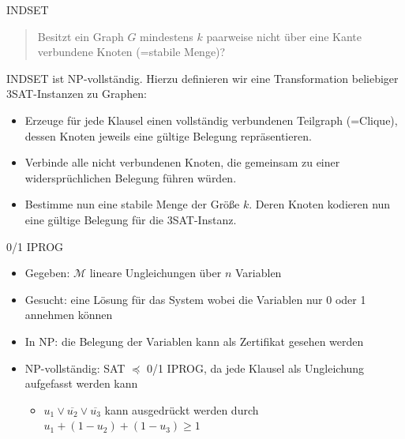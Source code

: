 \documentclass[ignorenonframetext,]{beamer}
\begin{document}
\begin{frame}{INDSET}

\begin{quote}
Besitzt ein Graph $G$ mindestens $k$ paarweise nicht über eine Kante
verbundene Knoten (=stabile Menge)?
\end{quote}

INDSET ist NP-vollständig. Hierzu definieren wir eine Transformation
beliebiger 3SAT-Instanzen zu Graphen:

\begin{itemize}
\itemsep1pt\parskip0pt
\item
  Erzeuge für jede Klausel einen vollständig verbundenen Teilgraph
  (=Clique), dessen Knoten jeweils eine gültige Belegung repräsentieren.
\item
  Verbinde alle nicht verbundenen Knoten, die gemeinsam zu einer
  widersprüchlichen Belegung führen würden.
\item
  Bestimme nun eine stabile Menge der Größe $k$. Deren Knoten kodieren
  nun eine gültige Belegung für die 3SAT-Instanz.
\end{itemize}

\end{frame}

\begin{frame}{0/1 IPROG}

\begin{itemize}
\itemsep1pt\parskip0pt
\item
  Gegeben: $\mathcal{M}$ lineare Ungleichungen über $n$ Variablen
\item
  Gesucht: eine Lösung für das System wobei die Variablen nur 0 oder 1
  annehmen können
\item
  In NP: die Belegung der Variablen kann als Zertifikat gesehen werden
\item
  NP-vollständig: SAT $\preceq$ 0/1 IPROG, da jede Klausel als
  Ungleichung aufgefasst werden kann

  \begin{itemize}
  \itemsep1pt\parskip0pt
  \item
    $u_1 \vee \overline{u_2} \vee \overline{u_3}$ kann ausgedrückt
    werden durch $u_1 + (1 - u_2) + (1 - u_3) \geq 1$
  \end{itemize}
\end{itemize}

\end{frame}
\end{document}
